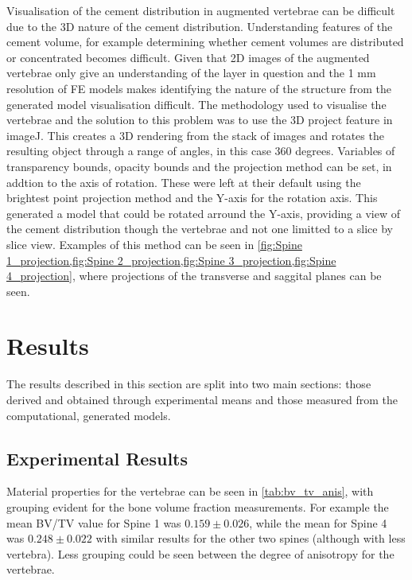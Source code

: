 Visualisation of the cement distribution in augmented vertebrae can be
difficult due to the 3D nature of the cement distribution. Understanding features of the cement volume, for example determining
whether cement volumes are distributed or concentrated becomes difficult.
Given that 2D images of the augmented vertebrae only give an understanding of
the layer in question and the 1 mm resolution of FE
models makes identifying the nature of the structure from the generated model visualisation difficult.
The methodology used to visualise the vertebrae and the solution to this
problem was to use the 3D project feature in imageJ. This creates a 3D
rendering from the stack of images and rotates the resulting object through a
range of angles, in this case 360 degrees. Variables of transparency bounds,
opacity bounds and the projection method can be set, in addtion to the axis of
rotation. These were left at their default using the brightest point projection
method and the Y-axis for the rotation axis. This generated a model that could
be rotated arround the Y-axis, providing a view of the cement distribution
though the vertebrae and not one limitted to a slice by slice view. Examples of
this method can be seen in \cref{fig:Spine 1_projection,fig:Spine
2_projection,fig:Spine 3_projection,fig:Spine 4_projection}, where projections of the
transverse and saggital planes can be seen. 



\section{Results}

The results described in this section are split into two main sections: those derived and obtained through experimental means and those measured from the computational, generated models.

\subsection{Experimental Results}\label{sec:aug_stiffness_res}

Material properties for the vertebrae can be seen in \cref{tab:bv_tv_anis},
with grouping evident for the bone volume fraction measurements.
For example the mean BV/TV value for Spine 1 was $0.159 \pm 0.026$, while the
mean for Spine 4 was $0.248 \pm 0.022$ with similar results for the other two
spines (although with less vertebra).
Less grouping could be seen between the degree of anisotropy for the vertebrae.

